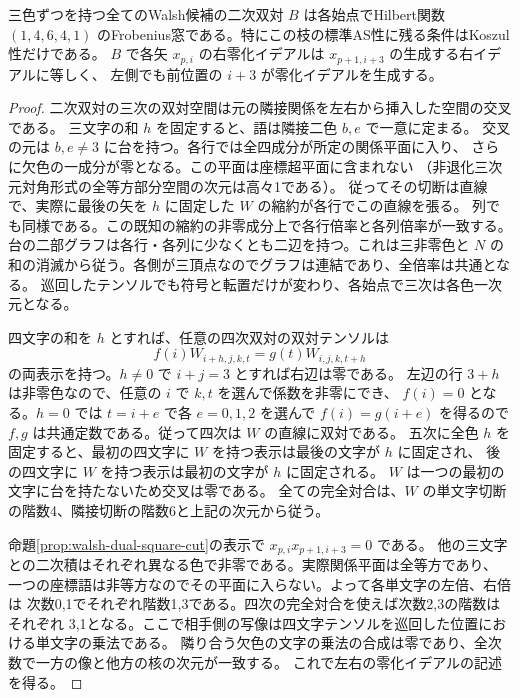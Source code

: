 \begin{theorem}\label{thm:walsh-dual-frobenius}
三色ずつを持つ全てのWalsh候補の二次双対 $B$ は各始点でHilbert関数
$(1,4,6,4,1)$ のFrobenius窓である。特にこの枝の標準AS性に残る条件はKoszul性だけである。
$B$ で各矢 $x_{p,i}$ の右零化イデアルは $x_{p+1,i+3}$ の生成する右イデアルに等しく、
左側でも前位置の $i+3$ が零化イデアルを生成する。
\end{theorem}
\begin{proof}
二次双対の三次の双対空間は元の隣接関係を左右から挿入した空間の交叉である。
三文字の和 $h$ を固定すると、語は隣接二色 $b,e$ で一意に定まる。
交叉の元は $b,e\ne3$ に台を持つ。各行では全四成分が所定の関係平面に入り、
さらに欠色の一成分が零となる。この平面は座標超平面に含まれない
（非退化三次元対角形式の全等方部分空間の次元は高々1である）。
従ってその切断は直線で、実際に最後の矢を $h$ に固定した $W$ の縮約が各行でこの直線を張る。
列でも同様である。この既知の縮約の非零成分上で各行倍率と各列倍率が一致する。
台の二部グラフは各行・各列に少なくとも二辺を持つ。これは三非零色と
$N$ の和の消滅から従う。各側が三頂点なのでグラフは連結であり、全倍率は共通となる。
巡回したテンソルでも符号と転置だけが変わり、各始点で三次は各色一次元となる。

四文字の和を $h$ とすれば、任意の四次双対の双対テンソルは
\[
        f(i)W_{i+h,j,k,t}=g(t)W_{i,j,k,t+h}
\]
の両表示を持つ。$h\ne0$ で $i+j=3$ とすれば右辺は零である。
左辺の行 $3+h$ は非零色なので、任意の $i$ で $k,t$ を選んで係数を非零にでき、
$f(i)=0$ となる。$h=0$ では $t=i+e$ で各 $e=0,1,2$ を選んで
$f(i)=g(i+e)$ を得るので $f,g$ は共通定数である。従って四次は $W$ の直線に双対である。
五次に全色 $h$ を固定すると、最初の四文字に $W$ を持つ表示は最後の文字が $h$ に固定され、
後の四文字に $W$ を持つ表示は最初の文字が $h$ に固定される。
$W$ は一つの最初の文字に台を持たないため交叉は零である。
全ての完全対合は、$W$ の単文字切断の階数4、隣接切断の階数6と上記の次元から従う。

命題\ref{prop:walsh-dual-square-cut}の表示で $x_{p,i}x_{p+1,i+3}=0$ である。
他の三文字との二次積はそれぞれ異なる色で非零である。実際関係平面は全等方であり、
一つの座標語は非等方なのでその平面に入らない。よって各単文字の左倍、右倍は
次数0,1でそれぞれ階数1,3である。四次の完全対合を使えば次数2,3の階数はそれぞれ
3,1となる。ここで相手側の写像は四文字テンソルを巡回した位置における単文字の乗法である。
隣り合う欠色の文字の乗法の合成は零であり、全次数で一方の像と他方の核の次元が一致する。
これで左右の零化イデアルの記述を得る。
\end{proof}
